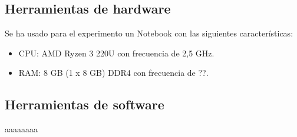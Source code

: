 \documentclass[11pt, twocolumn]{llncs}
\begin{document}
\subsection{Herramientas de hardware}
Se ha usado para el experimento un Notebook con las siguientes características:

\begin{itemize}
    \item CPU: AMD Ryzen 3 220U con frecuencia de 2,5 GHz.
    \item RAM: 8 GB (1 x 8 GB) DDR4 con frecuencia de ??.
\end{itemize}

\subsection{Herramientas de software}

aaaaaaaa

\end{document}

